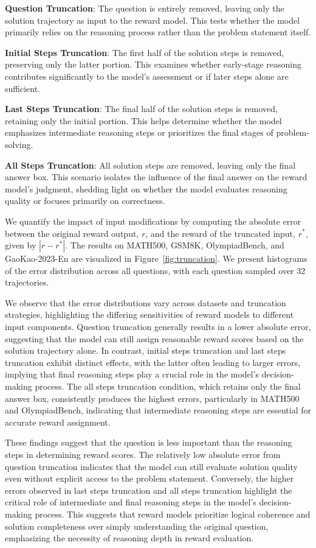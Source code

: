 \documentclass{article}
\begin{document}
\textbf{Question Truncation}: The question is entirely removed, leaving only the solution trajectory as input to the reward model. This tests whether the model primarily relies on the reasoning process rather than the problem statement itself.

\textbf{Initial Steps Truncation}: The first half of the solution steps is removed, preserving only the latter portion. This examines whether early-stage reasoning contributes significantly to the model’s assessment or if later steps alone are sufficient.

\textbf{Last Steps Truncation}: The final half of the solution steps is removed, retaining only the initial portion. This helps determine whether the model emphasizes intermediate reasoning steps or prioritizes the final stages of problem-solving.

\textbf{All Steps Truncation}: All solution steps are removed, leaving only the final answer box. This scenario isolates the influence of the final answer on the reward model’s judgment, shedding light on whether the model evaluates reasoning quality or focuses primarily on correctness.

We quantify the impact of input modifications by computing the absolute error between the original reward output, $r$, and the reward of the truncated input, $r^*$, given by $|r - r^*|$. The results on MATH500, GSM8K, OlympiadBench, and GaoKao-2023-En are visualized in Figure~\ref{fig:truncation}. We present histograms of the error distribution across all questions, with each question sampled over 32 trajectories.

We observe that the error distributions vary across datasets and truncation strategies, highlighting the differing sensitivities of reward models to different input components. Question truncation generally results in a lower absolute error, suggesting that the model can still assign reasonable reward scores based on the solution trajectory alone. In contrast, initial steps truncation and last steps truncation exhibit distinct effects, with the latter often leading to larger errors, implying that final reasoning steps play a crucial role in the model’s decision-making process. The all steps truncation condition, which retains only the final answer box, consistently produces the highest errors, particularly in MATH500 and OlympiadBench, indicating that intermediate reasoning steps are essential for accurate reward assignment.

These findings suggest that the question is less important than the reasoning steps in determining reward scores. The relatively low absolute error from question truncation indicates that the model can still evaluate solution quality even without explicit access to the problem statement. Conversely, the higher errors observed in last steps truncation and all steps truncation highlight the critical role of intermediate and final reasoning steps in the model’s decision-making process. This suggests that reward models prioritize logical coherence and solution completeness over simply understanding the original question, emphasizing the necessity of reasoning depth in reward evaluation.
\end{document}
